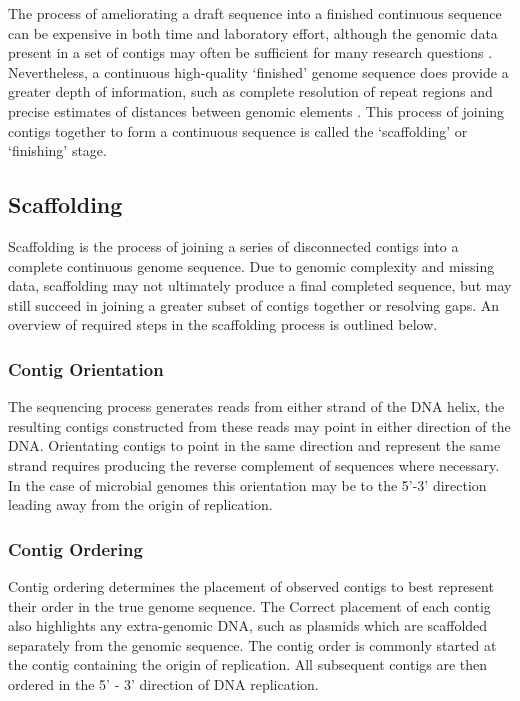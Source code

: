 \documentclass[10pt]{bmc_article}
\newenvironment{bmcformat}{\begin{raggedright}\baselineskip20pt\sloppy\setboolean{publ}{false}}{\end{raggedright}\baselineskip20pt\sloppy}
\begin{document}
\begin{bmcformat}
The process of ameliorating a draft sequence into a finished continuous
sequence can be expensive in both time and laboratory effort, although the
genomic data present in a set of contigs may often be sufficient for many
research questions \cite{branscomb2002}. Nevertheless, a continuous
high-quality `finished' genome sequence does provide a greater depth of
information, such as complete resolution of repeat regions and precise
estimates of distances between genomic elements \cite{parkhill2002,fraser2002}.
This process of joining contigs together to form a continuous sequence is
called the `scaffolding' or `finishing' stage. \pb

\subsection*{Scaffolding} %

Scaffolding is the process of joining a series of disconnected contigs into
a complete continuous genome sequence. Due to genomic complexity and missing
data, scaffolding may not ultimately produce a final completed sequence, but
may still succeed in joining a greater subset of contigs together or resolving
gaps. An overview of required steps in the scaffolding process is outlined
below.

\subsubsection*{Contig Orientation} %

The sequencing process generates reads from either strand of the DNA helix, the
resulting contigs constructed from these reads may point in either direction of
the DNA. Orientating contigs to point in the same direction and represent the
same strand requires producing the reverse complement of sequences where
necessary. In the case of microbial genomes this orientation may be to the
5'-3' direction leading away from the origin of replication.

\subsubsection*{Contig Ordering} %

Contig ordering determines the placement of observed contigs to best represent
their order in the true genome sequence. The Correct placement of each contig
also highlights any extra-genomic DNA, such as plasmids which are scaffolded
separately from the genomic sequence. The contig order is commonly started at
the contig containing the origin of replication. All subsequent contigs are
then ordered in the 5' - 3' direction of DNA replication.


\end{bmcformat}
\end{document}
